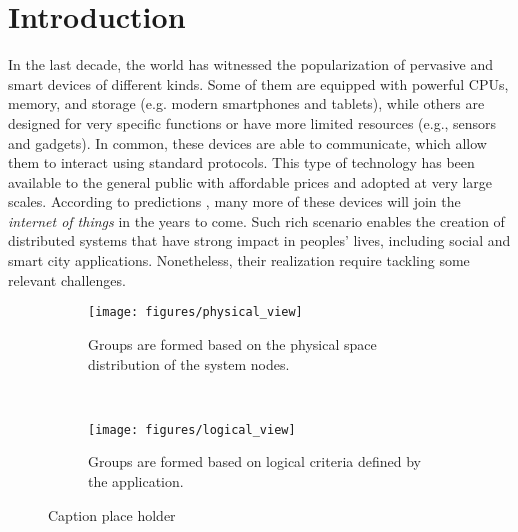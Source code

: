 \section{Introduction}
\label{sec:intro}


In the last decade, the world has witnessed the popularization of pervasive and smart devices of different kinds. Some of them are equipped with powerful CPUs, memory, and storage (e.g. modern smartphones and tablets), while others are designed for very specific functions or have more limited resources (e.g., sensors and gadgets). In common, these devices are able to communicate, which allow them to interact using standard protocols. This type of technology has been available to the general public with affordable prices and adopted at very large scales. According to predictions \cite{CITATION}, many more of these devices will join the \textit{internet of things} in the years to come. Such rich scenario enables the creation of distributed systems that have strong impact in peoples' lives, including social and smart city applications. Nonetheless, their realization require tackling some relevant challenges.


\begin{figure*}[t!]
    \centering
    \begin{subfigure}[b]{0.5\textwidth}
        \centering
        \texttt{[image: figures/physical\_view]}
        \caption{Groups are formed based on the physical space distribution of the system nodes.}
    \end{subfigure}%
    ~ 
    \begin{subfigure}[b]{0.5\textwidth}
        \centering
        \texttt{[image: figures/logical\_view]}
        \caption{Groups are formed based on logical criteria defined by the application.}
    \end{subfigure}
    \caption{Caption place holder}
\end{figure*}


